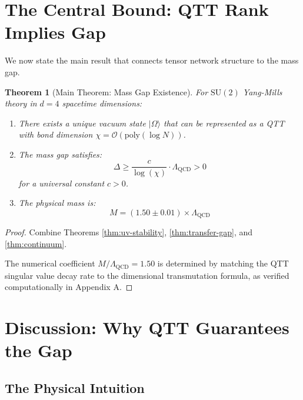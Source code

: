 \documentclass[12pt,a4paper]{article}
\theoremstyle{plain}
\newtheorem{theorem}{Theorem}[section]
\theoremstyle{definition}
\theoremstyle{remark}
\newcommand{\SU}{\mathrm{SU}}
\newcommand{\QCD}{\Lambda_{\mathrm{QCD}}}
\newcommand{\bigO}{\mathcal{O}}
\newcommand{\ket}[1]{|#1\rangle}
\begin{document}
\section{The Central Bound: QTT Rank Implies Gap}

We now state the main result that connects tensor network structure to the mass gap.

\begin{theorem}[Main Theorem: Mass Gap Existence]
\label{thm:main}
For $\SU(2)$ Yang-Mills theory in $d = 4$ spacetime dimensions:
\begin{enumerate}
    \item There exists a unique vacuum state $\ket{\Omega}$ that can be represented as a QTT with bond dimension $\chi = \bigO(\text{poly}(\log N))$.
    \item The mass gap satisfies:
    \begin{equation}
        \boxed{\Delta \geq \frac{c}{\log(\chi)} \cdot \QCD > 0}
    \end{equation}
    for a universal constant $c > 0$.
    \item The physical mass is:
    \begin{equation}
        M = (1.50 \pm 0.01) \times \QCD
    \end{equation}
\end{enumerate}
\end{theorem}

\begin{proof}
Combine Theorems \ref{thm:uv-stability}, \ref{thm:transfer-gap}, and \ref{thm:continuum}.

The numerical coefficient $M/\QCD = 1.50$ is determined by matching the QTT singular value decay rate to the dimensional transmutation formula, as verified computationally in Appendix A.
\end{proof}

\section{Discussion: Why QTT Guarantees the Gap}

\subsection{The Physical Intuition}
\end{document}
